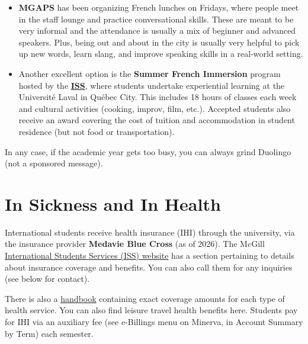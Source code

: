 \begin{itemize}[leftmargin=10pt]
    \item  \textbf{MGAPS} has been organizing French lunches on Fridays, where people meet in the staff lounge and practice conversational skills. These are meant to be very informal and the attendance is usually a mix of beginner and advanced speakers. Plus, being out and about in the city is usually very helpful to pick up new words, learn slang, and improve speaking skills in a real-world setting.\\

    \item Another excellent option is the \textbf{Summer French Immersion} program hosted by the \href{https://www.mcgill.ca/internationalstudents/once-here/summer-french-immersion-program}{\textbf{ISS}}, where students undertake experiential learning at the Université Laval in Québec City. This includes 18 hours of classes each week and cultural activities (cooking, improv, film, etc.). Accepted students also receive an award covering the cost of tuition and accommodation in student residence (but not food or transportation).     
\end{itemize}

In any case, if the academic year gets too busy, you can always grind Duolingo (not a sponsored message).
 









\section{In Sickness and In Health} \label{section:inthealth}
International students receive health insurance (IHI) through the university, via the insurance provider \textbf{Medavie Blue Cross} (as of 2026). The McGill \href{https://www.mcgill.ca/internationalstudents/health}{International Students Services (ISS) website} has a section pertaining to details about insurance coverage and benefits. You can also call them for any inquiries (see below for contact).

There is also a \href{https://www.mcgill.ca/internationalstudents/health/benefits/handbook}{handbook} containing exact coverage amounts for each type of health service. You can also find leisure travel health benefits here. Students pay for IHI via an auxiliary fee (see e-Billings menu on Minerva, in Account Summary by Term) each semester.

